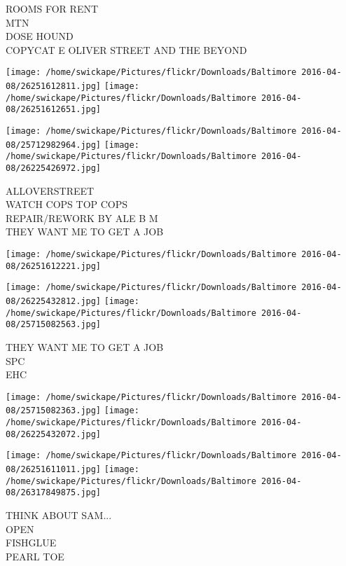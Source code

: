 \documentclass[10pt,letterpaper]{article}
\begin{document}
ROOMS FOR RENT\\
MTN\\
DOSE HOUND\\
COPYCAT E OLIVER STREET AND THE BEYOND\\
\pagebreak

\texttt{[image: /home/swickape/Pictures/flickr/Downloads/Baltimore 2016-04-08/26251612811.jpg]}
\texttt{[image: /home/swickape/Pictures/flickr/Downloads/Baltimore 2016-04-08/26251612651.jpg]}

\texttt{[image: /home/swickape/Pictures/flickr/Downloads/Baltimore 2016-04-08/25712982964.jpg]}
\texttt{[image: /home/swickape/Pictures/flickr/Downloads/Baltimore 2016-04-08/26225426972.jpg]}

ALLOVERSTREET\\
WATCH COPS TOP COPS\\
REPAIR/REWORK BY ALE B M\\
THEY WANT ME TO GET A JOB\\
\pagebreak

\texttt{[image: /home/swickape/Pictures/flickr/Downloads/Baltimore 2016-04-08/26251612221.jpg]}

\vspace{0.25in}
\texttt{[image: /home/swickape/Pictures/flickr/Downloads/Baltimore 2016-04-08/26225432812.jpg]}
\texttt{[image: /home/swickape/Pictures/flickr/Downloads/Baltimore 2016-04-08/25715082563.jpg]}

THEY WANT ME TO GET A JOB\\
SPC\\
EHC\\
\pagebreak

\texttt{[image: /home/swickape/Pictures/flickr/Downloads/Baltimore 2016-04-08/25715082363.jpg]}
\texttt{[image: /home/swickape/Pictures/flickr/Downloads/Baltimore 2016-04-08/26225432072.jpg]}

\texttt{[image: /home/swickape/Pictures/flickr/Downloads/Baltimore 2016-04-08/26251611011.jpg]}
\texttt{[image: /home/swickape/Pictures/flickr/Downloads/Baltimore 2016-04-08/26317849875.jpg]}

THINK ABOUT SAM...\\
OPEN\\
FISHGLUE\\
PEARL TOE\\
\pagebreak
\end{document}
